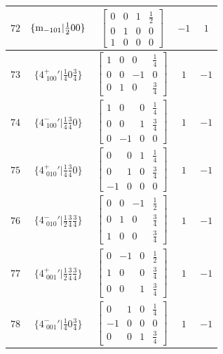 \documentclass[fleqn,8pt]{jsarticle}
\begin{document}
\begin{longtable}{ccccc}
$ 72 $ & $ \{{\rm m}_{-101}|\frac{1}{2} 0 0\} $ & $ \begin{bmatrix} 0 & 0 & 1 & \frac{1}{2} \\ 0 & 1 & 0 & 0 \\ 1 & 0 & 0 & 0 \end{bmatrix} $ & $ -1 $ & $ 1 $ \\ \hline
$ 73 $ & $ \{4^{+}_{\,\,100}{}'|\frac{1}{4} 0 \frac{3}{4}\} $ & $ \begin{bmatrix} 1 & 0 & 0 & \frac{1}{4} \\ 0 & 0 & -1 & 0 \\ 0 & 1 & 0 & \frac{3}{4} \end{bmatrix} $ & $ 1 $ & $ -1 $ \\ \hline
$ 74 $ & $ \{4^{-}_{\,\,100}{}'|\frac{1}{4} \frac{3}{4} 0\} $ & $ \begin{bmatrix} 1 & 0 & 0 & \frac{1}{4} \\ 0 & 0 & 1 & \frac{3}{4} \\ 0 & -1 & 0 & 0 \end{bmatrix} $ & $ 1 $ & $ -1 $ \\ \hline
$ 75 $ & $ \{4^{+}_{\,\,010}{}'|\frac{1}{4} \frac{3}{4} 0\} $ & $ \begin{bmatrix} 0 & 0 & 1 & \frac{1}{4} \\ 0 & 1 & 0 & \frac{3}{4} \\ -1 & 0 & 0 & 0 \end{bmatrix} $ & $ 1 $ & $ -1 $ \\ \hline
$ 76 $ & $ \{4^{-}_{\,\,010}{}'|\frac{1}{2} \frac{3}{4} \frac{3}{4}\} $ & $ \begin{bmatrix} 0 & 0 & -1 & \frac{1}{2} \\ 0 & 1 & 0 & \frac{3}{4} \\ 1 & 0 & 0 & \frac{3}{4} \end{bmatrix} $ & $ 1 $ & $ -1 $ \\ \hline
$ 77 $ & $ \{4^{+}_{\,\,001}{}'|\frac{1}{2} \frac{3}{4} \frac{3}{4}\} $ & $ \begin{bmatrix} 0 & -1 & 0 & \frac{1}{2} \\ 1 & 0 & 0 & \frac{3}{4} \\ 0 & 0 & 1 & \frac{3}{4} \end{bmatrix} $ & $ 1 $ & $ -1 $ \\ \hline
$ 78 $ & $ \{4^{-}_{\,\,001}{}'|\frac{1}{4} 0 \frac{3}{4}\} $ & $ \begin{bmatrix} 0 & 1 & 0 & \frac{1}{4} \\ -1 & 0 & 0 & 0 \\ 0 & 0 & 1 & \frac{3}{4} \end{bmatrix} $ & $ 1 $ & $ -1 $ \\ \hline

\end{longtable}
\end{document}
